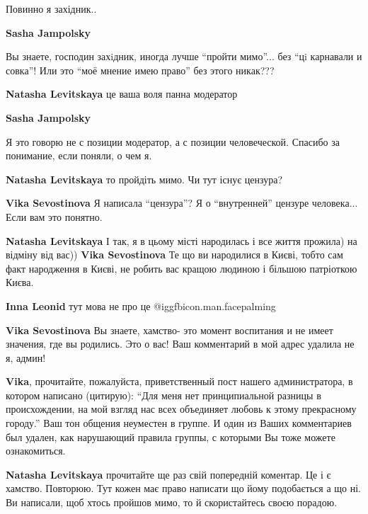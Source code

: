 \begin{itemize}
Повинно я західник..

\begin{itemize} %
\textbf{Sasha Jampolsky}

Вы знаете, господин захiдник, иногда лучше \enquote{пройти мимо}... без \enquote{цi карнавали и
совка}! Или это \enquote{моё мнение имею право} без этого никак???

\begin{itemize} %
\textbf{Natasha Levitskaya} це ваша воля панна модератор

\textbf{Sasha Jampolsky}

Я это говорю не с позиции модератор, а с позиции человеческой. Спасибо за
понимание, если поняли, о чем я.

\textbf{Natasha Levitskaya} то пройдіть мимо. Чи тут існує цензура?

\textbf{Vika Sevostinova}
Я написала \enquote{цензура}? Я о \enquote{внутренней} цензуре человека...
Если вам это понятно.

\textbf{Natasha Levitskaya} І так, я в цьому місті народилась і все життя прожила) на відміну від вас))
\textbf{Vika Sevostinova}
Те що ви народилися в Києві, тобто сам факт народження в Києві, не робить вас кращою людиною і більшою патріоткою Києва.

\textbf{Inna Leonid} тут мова не про це @igg{fbicon.man.facepalming} 

\textbf{Vika Sevostinova}
Вы знаете, хамство- это момент воспитания и не имеет значения, где вы родились. Это о вас!
Ваш комментарий в мой адрес удалила не я, админ!


\textbf{Vika}, прочитайте, пожалуйста, приветственный пост нашего администратора, в
котором написано (цитирую): \enquote{Для меня нет принципиальной разницы в
происхождении, на мой взгляд нас всех объединяет любовь к этому прекрасному
городу.} Ваш тон общения неуместен в группе. И один из Ваших комментариев был
удален, как нарушающий правила группы, с которыми Вы тоже можете ознакомиться.

\textbf{Natasha Levitskaya} прочитайте ще раз свій попередній коментар. Це і є хамство. Повторюю. Тут кожен має право написати що йому подобається а що ні. Ви написали, щоб хтось пройшов мимо, то й скористайтесь своєю порадою.


\end{itemize}
\end{itemize}
\end{itemize}
